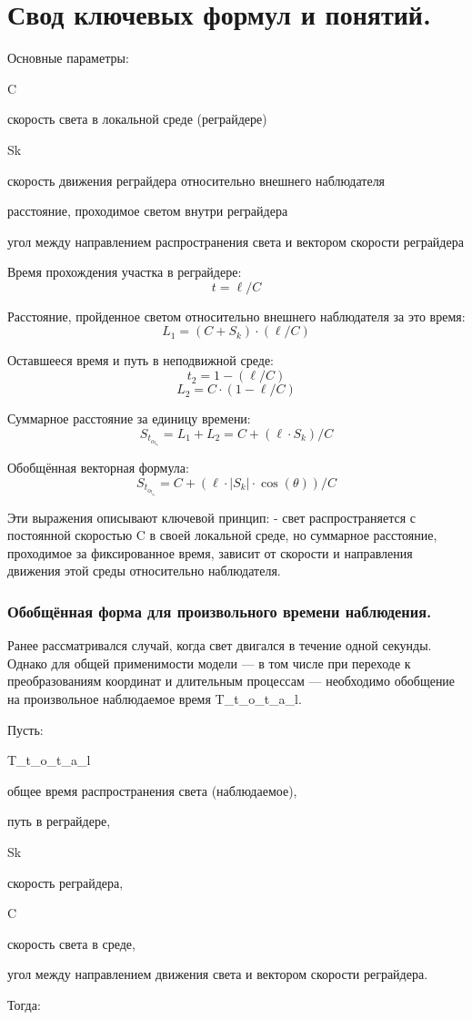 \documentclass[12pt]{article}
\begin{document}
\section*{Свод ключевых формул и понятий.}

Основные параметры:
\par
C
\par
скорость света в локальной среде (реграйдере)
\par
Sk
\par
скорость движения реграйдера относительно внешнего наблюдателя
\par
\ell
\par
расстояние, проходимое светом внутри реграйдера
\par
\theta
\par 
угол между направлением распространения света и вектором скорости реграйдера
\par
Время прохождения участка в реграйдере:
\[
t = \ell / C
\]

Расстояние, пройденное светом относительно внешнего наблюдателя за это время:
\[
L_1 = (C + S_k) \cdot (\ell / C)
\]

Оставшееся время и путь в неподвижной среде:
\[
t_2 = 1 - (\ell / C)
\]
\[
L_2 = C \cdot (1 - \ell / C)
\]

Суммарное расстояние за единицу времени:
\[
S_t_o_t_a_l = L_1 + L_2 = C + (\ell \cdot S_k) / C
\]

Обобщённая векторная формула:
\[
S_t_o_t_a_l = C + (\ell \cdot \left|S_k\right| \cdot \cos(\theta)) / C
\]

Эти выражения описывают ключевой принцип:
- свет распространяется с постоянной скоростью C в своей локальной среде, но суммарное расстояние, проходимое за фиксированное время, зависит от скорости и направления движения этой среды относительно наблюдателя.

\subsubsection*{Обобщённая форма для произвольного времени наблюдения.}
Ранее рассматривался случай, когда свет двигался в течение одной секунды. Однако для общей применимости модели — в том числе при переходе к преобразованиям координат и длительным процессам — необходимо обобщение на произвольное наблюдаемое время T_t_o_t_a_l.

Пусть:
\par
T_t_o_t_a_l 
\par
общее время распространения света (наблюдаемое),
\par
\ell
\par 
путь в реграйдере,
\par
Sk 
\par
скорость реграйдера,
\par
C 
\par
скорость света в среде,
\par
\theta
\par 
угол между направлением движения света и вектором скорости реграйдера.
\par
Тогда:
\end{document}
